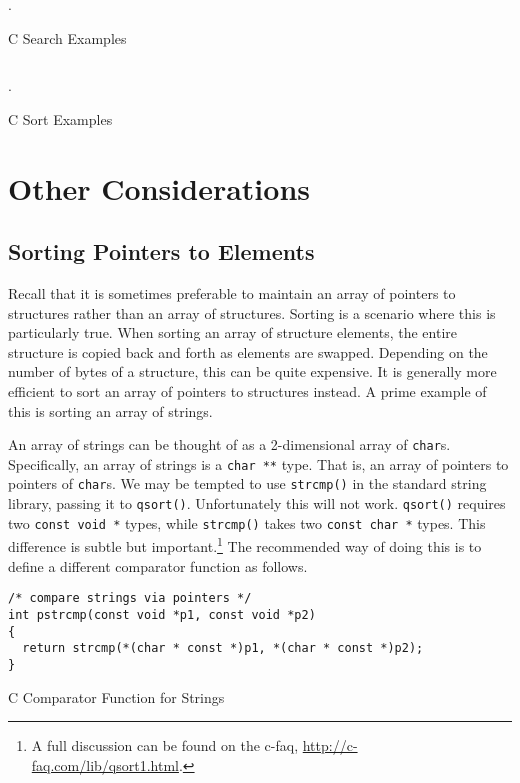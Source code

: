 \begin{listing}[H]
\inputminted[fontsize=\scriptsize]{c}{code/searchDemo.c}.
\caption{C Search Examples}
\label{code:c:searchExamples}
\end{listing}

\begin{listing}[H]
\inputminted[]{c}{code/sortDemo.c}.
\caption{C Sort Examples}
\label{code:c:sortExamples}
\end{listing}

\section{Other Considerations}

\subsection{Sorting Pointers to Elements}

Recall that it is sometimes preferable to maintain an array of pointers
to structures rather than an array of structures.  Sorting is a scenario
where this is particularly true.  When sorting an array of structure
elements, the entire structure is copied back and forth as elements
are swapped.  Depending on the number of bytes of a structure, this can
be quite expensive.  It is generally more efficient to sort an array of 
pointers to structures instead.  A prime example of this is sorting an
array of strings.

An array of strings can be thought of as a 2-dimensional array of 
\texttt{char}s.  Specifically, an array of strings is a 
\texttt{char **} type.  That is, an array of pointers to 
pointers of \texttt{char}s.  We may be tempted to use 
\texttt{strcmp()} in the standard string library, passing it 
to \texttt{qsort()}.  
Unfortunately this will not work.  \texttt{qsort()} requires 
two \texttt{const void *} types, while \texttt{strcmp()} 
takes two \texttt{const char *} types.  This difference is 
subtle but important.\footnote{A full discussion can be found on the 
c-faq, \url{http://c-faq.com/lib/qsort1.html}.}  The recommended way 
of doing this is to define a different comparator function as follows.

\begin{listing}[H]
\begin{verbatim}
/* compare strings via pointers */
int pstrcmp(const void *p1, const void *p2)
{
  return strcmp(*(char * const *)p1, *(char * const *)p2);
}
\end{verbatim}
\caption{C Comparator Function for Strings}
\end{listing}

